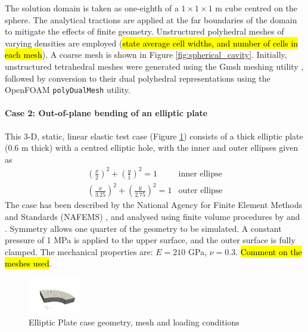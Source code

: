 \documentclass[sn-mathphys,Numbered,draft]{sn-jnl}%
\begin{document}
The solution domain is taken as one-eighth of a $1 \times 1 \times 1$ m cube centred on the sphere.
The analytical tractions are applied at the far boundaries of the domain to mitigate the effects of finite geometry.
Unstructured polyhedral meshes of varying densities are employed (\hl{state average cell widths, and number of cells in each mesh}).
A coarse mesh is shown in Figure \ref{fig:spherical_cavity}.
Initially, unstructured tetrahedral meshes were generated using the Gmsh meshing utility \cite{Gmsh}, followed by conversion to their dual polyhedral representations using the OpenFOAM \texttt{polyDualMesh} utility.


\paragraph{Case 2: Out-of-plane bending of an elliptic plate}
This 3-D, static, linear elastic test case (Figure \ref{fig:elliptic_plate}) consists of a thick elliptic plate (0.6 m thick) with a centred elliptic hole, with the inner and outer ellipses given as
\begin{eqnarray}
	\left(\frac{x}{2}\right)^2 + \left(\frac{y}{1}\right)^2 = 1 & \text{inner ellipse} \\
	\left(\frac{x}{3.25}\right)^2 + \left(\frac{y}{2.75}\right)^2 = 1 & \text{outer ellipse}
\end{eqnarray}
The case has been described by the National Agency for Finite Element Methods and Standards (NAFEMS) \cite{NAFEMS}, and analysed using finite volume procedures by \citet{Demirdzic} and \citet{Cardiff2016}.
Symmetry allows one quarter of the geometry to be simulated.
A constant pressure of 1 MPa is applied to the upper surface, and the outer surface is fully clamped.
The mechanical properties are: $E = 210$ GPa, $\nu = 0.3$.
\hl{Comment on the meshes used}.
\begin{figure}[htbp]
   \centering
   \includegraphics[width=0.2\textwidth]{figures/elliptic_plate.pdf} 
   \caption{Elliptic Plate case geometry, mesh and loading conditions}
   \label{fig:elliptic_plate}
\end{figure}
\end{document}

